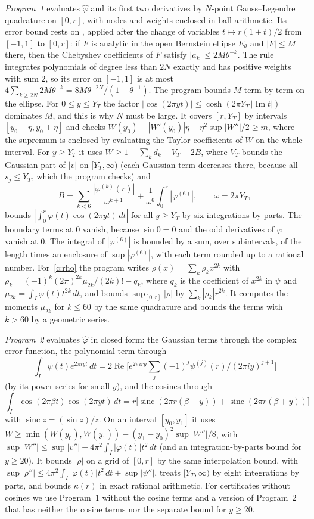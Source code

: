 \documentclass[11pt]{amsart}
\theoremstyle{definition}
\theoremstyle{remark}
\numberwithin{equation}{section}
\newcommand{\ft}[1]{\widehat{#1}}
\begin{document}
\emph{Program~1} evaluates $\ft\varphi$ and its first two derivatives by $N$-point Gauss--Legendre quadrature on $[0,r]$, with nodes and weights enclosed in ball arithmetic. Its error bound rests on \cite[Theorem~8.1]{Tre13}, applied after the change of variables $t\mapsto r(1+t)/2$ from $[-1,1]$ to $[0,r]$: if $F$ is analytic in the open Bernstein ellipse $E_{\theta}$ and $|F|\le M$ there, then the Chebyshev coefficients of $F$ satisfy $|a_k|\le2M\theta^{-k}$. The rule integrates polynomials of degree less than $2N$ exactly and has positive weights with sum $2$, so its error on $[-1,1]$ is at most $4\sum_{k\ge2N}2M\theta^{-k}=8M\theta^{-2N}/(1-\theta^{-1})$. The program bounds $M$ term by term on the ellipse. For $0\le y\le Y_T$ the factor $|\cos(2\pi yt)|\le\cosh(2\pi Y_T\,|\operatorname{Im}t|)$ dominates $M$, and this is why $N$ must be large. It covers $[r,Y_T]$ by intervals $[y_0-\eta,y_0+\eta]$ and checks $W(y_0)-|W'(y_0)|\eta-\eta^2\sup|W''|/2\ge m$, where the supremum is enclosed by evaluating the Taylor coefficients of $W$ on the whole interval. For $y\ge Y_T$ it uses $W\ge1-\sum_kd_k-V_T-2B$, where $V_T$ bounds the Gaussian part of $|v|$ on $[Y_T,\infty)$ (each Gaussian term decreases there, because all $s_j\le Y_T$, which the program checks) and
\[
B=\sum_{k<6}\frac{|\varphi^{(k)}(r)|}{\omega^{k+1}}+\frac{1}{\omega^{6}}\int_0^r|\varphi^{(6)}|,\qquad\omega=2\pi Y_T,
\]
bounds $|\int_0^r\varphi(t)\cos(2\pi yt)\,dt|$ for all $y\ge Y_T$ by six integrations by parts. The boundary terms at $0$ vanish, because $\sin0=0$ and the odd derivatives of $\varphi$ vanish at $0$. The integral of $|\varphi^{(6)}|$ is bounded by a sum, over subintervals, of the length times an enclosure of $\sup|\varphi^{(6)}|$, with each term rounded up to a rational number. For~\ref{c:rho} the program writes $\rho(x)=\sum_k\rho_kx^{2k}$ with $\rho_k=(-1)^k(2\pi)^{2k}\mu_{2k}/(2k)!-q_k$, where $q_k$ is the coefficient of $x^{2k}$ in $\psi$ and $\mu_{2k}=\int_I\varphi(t)t^{2k}\,dt$, and bounds $\sup_{[0,r]}|\rho|$ by $\sum_k|\rho_k|r^{2k}$. It computes the moments $\mu_{2k}$ for $k\le60$ by the same quadrature and bounds the terms with $k>60$ by a geometric series.

\emph{Program~2} evaluates $\ft\varphi$ in closed form: the Gaussian terms through the complex error function, the polynomial term through \[\int_I\psi(t)e^{2\pi iyt}\,dt=2\operatorname{Re}\bigl[e^{2\pi iry}\sum_j(-1)^j\psi^{(j)}(r)/(2\pi iy)^{j+1}\bigr]\] (by its power series for small $y$), and the cosines through \[\int_I\cos(2\pi\beta t)\cos(2\pi yt)\,dt=r\bigl[\operatorname{sinc}(2\pi r(\beta-y))+\operatorname{sinc}(2\pi r(\beta+y))\bigr]\] with $\operatorname{sinc}z=(\sin z)/z$. On an interval $[y_0,y_1]$ it uses $W\ge\min(W(y_0),W(y_1))-(y_1-y_0)^2\sup|W''|/8$, with $\sup|W''|\le\sup|v''|+4\pi^2\int_I|\varphi(t)|t^2\,dt$ (and an integration-by-parts bound for $y\ge20$). It bounds $|\rho|$ on a grid of $[0,r]$ by the same interpolation bound, with $\sup|\rho''|\le4\pi^2\int_I|\varphi(t)|t^2\,dt+\sup|\psi''|$, treats $[Y_T,\infty)$ by eight integrations by parts, and bounds $\kappa(r)$ in exact rational arithmetic. For certificates without cosines we use Program~1 without the cosine terms and a version of Program~2 that has neither the cosine terms nor the separate bound for $y\ge20$.
\end{document}
